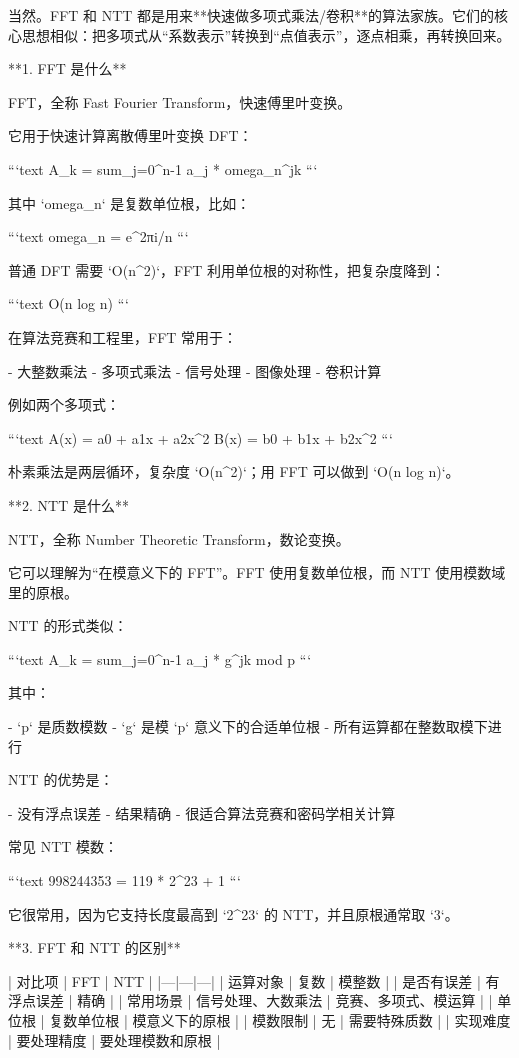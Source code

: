 当然。FFT 和 NTT 都是用来**快速做多项式乘法/卷积**的算法家族。它们的核心思想相似：把多项式从“系数表示”转换到“点值表示”，逐点相乘，再转换回来。

**1. FFT 是什么**

FFT，全称 Fast Fourier Transform，快速傅里叶变换。

它用于快速计算离散傅里叶变换 DFT：

```text
A_k = sum_{j=0}^{n-1} a_j * omega_n^{jk}
```

其中 `omega_n` 是复数单位根，比如：

```text
omega_n = e^{2πi/n}
```

普通 DFT 需要 `O(n^2)`，FFT 利用单位根的对称性，把复杂度降到：

```text
O(n log n)
```

在算法竞赛和工程里，FFT 常用于：

- 大整数乘法
- 多项式乘法
- 信号处理
- 图像处理
- 卷积计算

例如两个多项式：

```text
A(x) = a0 + a1x + a2x^2
B(x) = b0 + b1x + b2x^2
```

朴素乘法是两层循环，复杂度 `O(n^2)`；用 FFT 可以做到 `O(n log n)`。

**2. NTT 是什么**

NTT，全称 Number Theoretic Transform，数论变换。

它可以理解为“在模意义下的 FFT”。FFT 使用复数单位根，而 NTT 使用模数域里的原根。

NTT 的形式类似：

```text
A_k = sum_{j=0}^{n-1} a_j * g^{jk} mod p
```

其中：

- `p` 是质数模数
- `g` 是模 `p` 意义下的合适单位根
- 所有运算都在整数取模下进行

NTT 的优势是：

- 没有浮点误差
- 结果精确
- 很适合算法竞赛和密码学相关计算

常见 NTT 模数：

```text
998244353 = 119 * 2^23 + 1
```

它很常用，因为它支持长度最高到 `2^23` 的 NTT，并且原根通常取 `3`。

**3. FFT 和 NTT 的区别**

| 对比项 | FFT | NTT |
|---|---|---|
| 运算对象 | 复数 | 模整数 |
| 是否有误差 | 有浮点误差 | 精确 |
| 常用场景 | 信号处理、大数乘法 | 竞赛、多项式、模运算 |
| 单位根 | 复数单位根 | 模意义下的原根 |
| 模数限制 | 无 | 需要特殊质数 |
| 实现难度 | 要处理精度 | 要处理模数和原根 |

